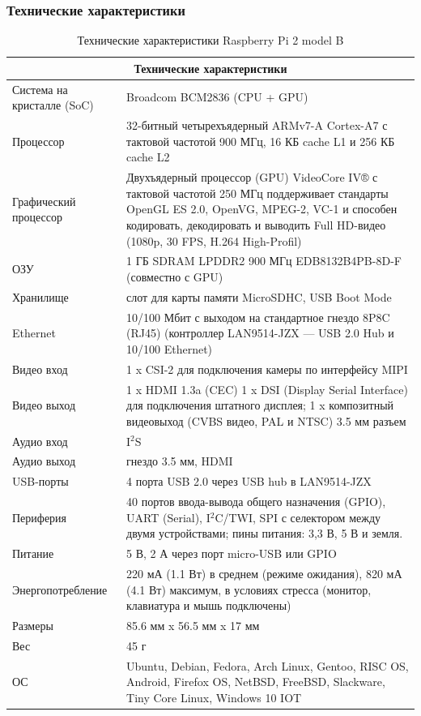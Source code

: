 \subsubsection{Технические характеристики}
\begin{table}[H]
	\caption{Технические характеристики Raspberry Pi 2 model B} \label{tab:tab2}
	\centering
	\begin{tabular}{|p{3.5cm}|p{12cm}|}
		\hline
		\multicolumn{2}{|c|}{Технические характеристики} \\
		\hline 
		Система на кристалле (SoC) & Broadcom BCM2836 (CPU + GPU) \\ 
		\hline 
		Процессор & 32-битный четырехъядерный ARMv7-A Cortex-A7 с тактовой частотой 900 МГц, 16 КБ cache L1 и 256 КБ cache L2 \\ 
		Графический процессор & Двухъядерный процессор (GPU) VideoCore IV® с тактовой частотой 250 МГц поддерживает стандарты OpenGL ES 2.0, OpenVG, MPEG-2, VC-1 и способен кодировать, декодировать и выводить Full HD-видео (1080p, 30 FPS, H.264 High-Profil) \\ 
		\hline 
		ОЗУ & 1 ГБ SDRAM LPDDR2 900 МГц EDB8132B4PB-8D-F (совместно с GPU) \\ 
		\hline 
		Хранилище & слот для карты памяти MicroSDHC, USB Boot Mode \\ 
		\hline 
		Ethernet & 10/100 Мбит с выходом на стандартное гнездо 8P8C (RJ45) (контроллер LAN9514-JZX — USB 2.0 Hub и 10/100 Ethernet) \\ 
		\hline 
		Видео вход & 1 x CSI-2 для подключения камеры по интерфейсу MIPI \\ 
		\hline 
		Видео выход & 1 x HDMI 1.3a (CEC) 1 x DSI (Display Serial Interface) для подключения штатного дисплея; 1 x композитный видеовыход (CVBS видео, PAL и NTSC) 3.5 мм разъем \\ 
		\hline 
		Аудио вход & I$^{2}$S \\ 
		\hline 
		Аудио выход & гнездо 3.5 мм, HDMI \\ 
		\hline 
		USB-порты & 4 порта USB 2.0 через USB hub в LAN9514-JZX \\ 
		\hline 
		Периферия & 40 портов ввода-вывода общего назначения (GPIO), UART (Serial), I$^{2}$C/TWI, SPI с селектором между двумя устройствами; пины питания: 3,3 В, 5 В и земля. \\ 
		\hline 
		Питание & 5 В, 2 А через порт micro-USB или GPIO \\ 
		\hline 
		Энергопотребление & 220 мА (1.1 Вт) в среднем (режиме ожидания), 820 мА (4.1 Вт) максимум, в условиях стресса (монитор, клавиатура и мышь подключены) \\ 
		\hline 
		Размеры & 85.6 мм x 56.5 мм x 17 мм \\ 
		\hline 
		Вес & 45 г \\ 
		\hline 
		ОС & Ubuntu, Debian, Fedora, Arch Linux, Gentoo, RISC OS, Android, Firefox OS, NetBSD, FreeBSD, Slackware, Tiny Core Linux, Windows 10 IOT \\ 
		\hline  
	\end{tabular}	
\end{table}

